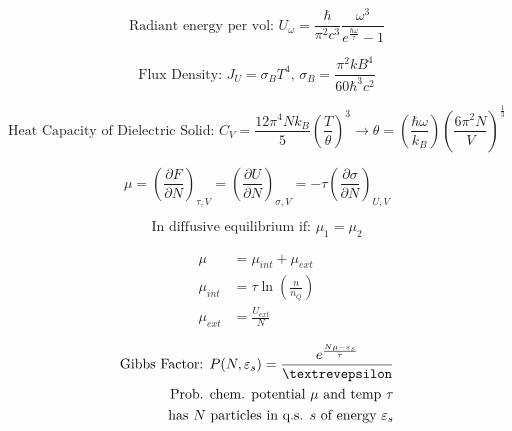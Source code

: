\documentclass[12pt]{article}
\begin{document}
\vspace{-30pt}

\begin{multicols}{2}

  \begin{equation*}
    \text{Radiant energy per vol: }U_\omega=\frac{\hbar}{\pi^2c^3}\frac{\omega^3}{e^{\frac{\hbar\omega}{\tau}}-1}
  \end{equation*}

  \begin{equation*}
    \text{Flux Density: }J_U=\sigma_BT^4,\,\sigma_B=\frac{\pi^2kB^4}{60\hbar^3c^2}
  \end{equation*}

\end{multicols}

\vspace{-20pt}

$$\text{Heat Capacity of Dielectric Solid: } C_V=\frac{12\pi^4Nk_B}{5}\left( \frac{T}{\theta} \right)^3\rightarrow\theta=\left( \frac{\hbar\omega}{k_B} \right)\left( \frac{6\pi^2N}{V} \right)^{\frac{1}{3}}$$

\begin{multicols}{2}

  \begin{equation*}
    \mu=\left( \frac{\partial F}{\partial N} \right)_{\tau,V}=\left( \frac{\partial U}{\partial N} \right)_{\sigma,V}=-\tau\left( \frac{\partial\sigma}{\partial N} \right)_{U,V}
  \end{equation*}

  \begin{equation*}
    \text{In diffusive equilibrium if: }\mu_1=\mu_2
  \end{equation*}

\end{multicols}

\begin{multicols}{2}

  \begin{equation*}
    \begin{split}
    \mu&=\mu_{int}+\mu_{ext}\\
    \mu_{int}&=\tau\ln\left( \frac{n}{n_Q} \right)\\
    \mu_{ext}&=\frac{U_{ext}}{N}
    \end{split}
  \end{equation*}

  \begin{equation*}
    \begin{split}
      \text{Gibbs Factor: }P(N,\varepsilon_s)=\frac{e^{\frac{N\mu-\varepsilon_s}{\tau}}}{\text{\textrevepsilon}}\\
      \text{Prob. chem. potential $\mu$ and temp $\tau$}\\
      \text{has $N$ particles in q.s. $s$ of energy $\varepsilon_s$}
    \end{split}
  \end{equation*}

\end{multicols}
\end{document}
